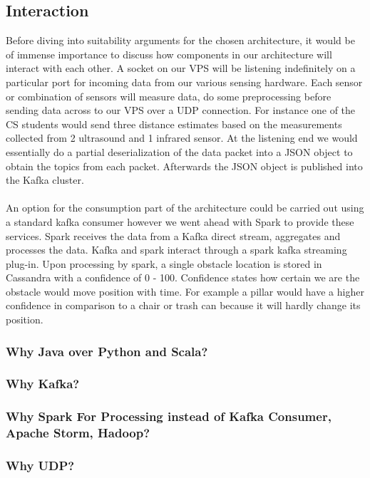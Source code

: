 \documentclass[prodmode,acmtosem]{acmsmall} %
\begin{document}
\subsection{Interaction}
Before diving into suitability arguments for the chosen architecture, it would be of immense importance to discuss how components in our architecture will interact with each other. A socket on our VPS will be listening indefinitely on a particular port for incoming data from our various sensing hardware. Each sensor or combination of sensors will measure data, do some preprocessing before sending data across to our VPS over a UDP connection. For instance one of the CS students would send three distance estimates based on the measurements collected from 2 ultrasound and 1 infrared sensor. At the listening end we would essentially do a partial deserialization of the data packet into a JSON object to obtain the topics from each packet. Afterwards the JSON object is published into the Kafka cluster.\\\\
An option for the consumption part of the architecture could be carried out using a standard kafka consumer however we went ahead with Spark to provide these services. Spark receives the data from a Kafka direct stream, aggregates and processes the data. Kafka and spark interact through a spark kafka streaming plug-in. Upon processing by spark, a single obstacle location is stored in Cassandra with a confidence of 0 - 100. Confidence states how certain we are the obstacle would move position with time. For example a pillar would have a higher confidence in comparison to a chair or trash can because it will hardly change its position.



\subsubsection{Why Java over Python and Scala?}

\subsubsection{Why Kafka?}

\subsubsection{Why Spark For Processing instead of Kafka Consumer, Apache Storm, Hadoop?}

\subsubsection{Why UDP?}
\end{document}
